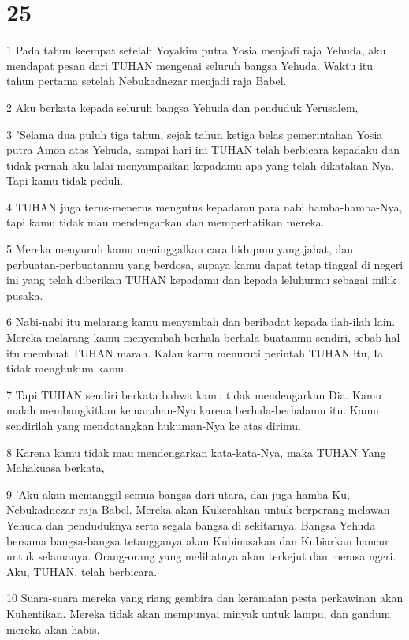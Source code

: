 \chapter{25}

\par 1 Pada tahun keempat setelah Yoyakim putra Yosia menjadi raja Yehuda, aku mendapat pesan dari TUHAN mengenai seluruh bangsa Yehuda. Waktu itu tahun pertama setelah Nebukadnezar menjadi raja Babel.
\par 2 Aku berkata kepada seluruh bangsa Yehuda dan penduduk Yerusalem,
\par 3 "Selama dua puluh tiga tahun, sejak tahun ketiga belas pemerintahan Yosia putra Amon atas Yehuda, sampai hari ini TUHAN telah berbicara kepadaku dan tidak pernah aku lalai menyampaikan kepadamu apa yang telah dikatakan-Nya. Tapi kamu tidak peduli.
\par 4 TUHAN juga terus-menerus mengutus kepadamu para nabi hamba-hamba-Nya, tapi kamu tidak mau mendengarkan dan memperhatikan mereka.
\par 5 Mereka menyuruh kamu meninggalkan cara hidupmu yang jahat, dan perbuatan-perbuatanmu yang berdosa, supaya kamu dapat tetap tinggal di negeri ini yang telah diberikan TUHAN kepadamu dan kepada leluhurmu sebagai milik pusaka.
\par 6 Nabi-nabi itu melarang kamu menyembah dan beribadat kepada ilah-ilah lain. Mereka melarang kamu menyembah berhala-berhala buatanmu sendiri, sebab hal itu membuat TUHAN marah. Kalau kamu menuruti perintah TUHAN itu, Ia tidak menghukum kamu.
\par 7 Tapi TUHAN sendiri berkata bahwa kamu tidak mendengarkan Dia. Kamu malah membangkitkan kemarahan-Nya karena berhala-berhalamu itu. Kamu sendirilah yang mendatangkan hukuman-Nya ke atas dirimu.
\par 8 Karena kamu tidak mau mendengarkan kata-kata-Nya, maka TUHAN Yang Mahakuasa berkata,
\par 9 'Aku akan memanggil semua bangsa dari utara, dan juga hamba-Ku, Nebukadnezar raja Babel. Mereka akan Kukerahkan untuk berperang melawan Yehuda dan penduduknya serta segala bangsa di sekitarnya. Bangsa Yehuda bersama bangsa-bangsa tetangganya akan Kubinasakan dan Kubiarkan hancur untuk selamanya. Orang-orang yang melihatnya akan terkejut dan merasa ngeri. Aku, TUHAN, telah berbicara.
\par 10 Suara-suara mereka yang riang gembira dan keramaian pesta perkawinan akan Kuhentikan. Mereka tidak akan mempunyai minyak untuk lampu, dan gandum mereka akan habis.
